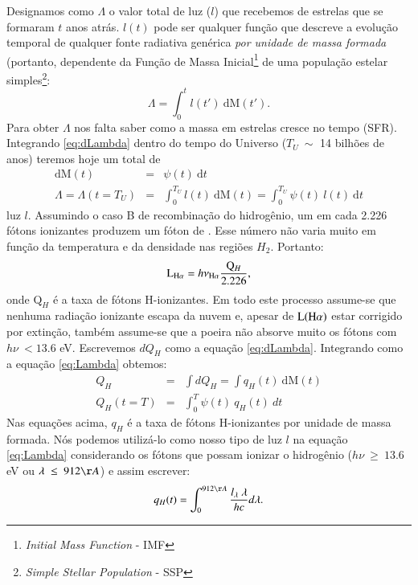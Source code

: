 Designamos como $\Lambda$ o valor total de luz ($l$) que recebemos de estrelas que se formaram $t$
anos atrás. $l(t)$ pode ser qualquer função que descreve a evolução temporal de qualquer fonte
radiativa genérica \emph{por unidade de massa formada} (portanto, dependente da Função de Massa
Inicial\footnote{{\em Initial Mass Function} - IMF} de uma população estelar simples\footnote{{\em
Simple Stellar Population} - SSP}:
\begin{equation}
	\Lambda = \int_0^t l(t')\ \textrm{d}\textrm{M}(t').
	\label{eq:dLambda}
\end{equation}
\noindent Para obter $\Lambda$ nos falta saber como a massa em estrelas cresce no tempo (SFR).
Integrando \eqref{eq:dLambda} dentro do tempo do Universo ($T_U\ \sim$ 14 bilhões de
anos) teremos hoje um total de
\begin{eqnarray}
	\mathrm{d}\mathrm{M}(t) &=& \psi(t)\ \mathrm{d}t \\
	\Lambda = \Lambda(t = T_U) &=& \int_0^{T_U} l(t)\ \textrm{d}\textrm{M}(t) = \int_0^{T_U} \psi(t)\
	l(t)\ \textrm{d}t
	\label{eq:Lambda}
\end{eqnarray}
\noindent luz $l$. Assumindo o caso B de recombinação do hidrogênio, um em cada 2.226 fótons
ionizantes produzem um fóton de \Halpha \citep{Osterbrock.Ferland.2006a}. Esse número não varia
muito em função da temperatura e da densidade nas regiões $H_2$. Portanto:
\begin{equation}
	\LHalpha = h \nu_{\Halpha} \frac{\mathrm{Q}_H}{2.226},
	\label{eq:LHa_recomb_theory}
\end{equation}
\noindent onde $\mathrm{Q}_H$ é a taxa de fótons H-ionizantes. Em todo este processo assume-se que
nenhuma radiação ionizante escapa da nuvem e, apesar de $\mathrm{L}(\Halpha)$ estar corrigido por
extinção, também assume-se que a poeira não absorve muito os fótons com $h\nu\ < 13.6$ eV.
Escrevemos $dQ_H$ como a equação \eqref{eq:dLambda}. Integrando como a equação \eqref{eq:Lambda}
obtemos:
\begin{eqnarray}
	Q_H &=& \int dQ_H = \int q_H(t)\ \mathrm{d}\mathrm{M}(t) \\ 
	Q_H(t = T) &=& \int_0^T \psi(t)\ q_H(t)\ dt
	\label{eq:QH}
\end{eqnarray}
\noindent Nas equações acima, $q_H$ é a taxa de fótons H-ionizantes por unidade de massa formada.
Nós podemos utilizá-lo como nosso tipo de luz $l$ na equação \eqref{eq:Lambda} considerando os
fótons que possam ionizar o hidrogênio ($h\nu\ \geq\ 13.6$ eV ou $\lambda\ \leq\ 912\AA$) e assim
escrever:
\begin{equation}
	q_H(t) = \int_0^{912\AA} \frac{l_\lambda\ \lambda}{h c} d\lambda.
	\label{eq:qH}
\end{equation}

